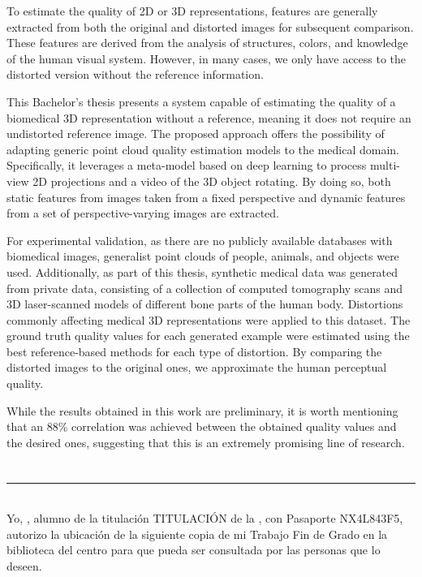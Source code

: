 To estimate the quality of 2D or 3D representations, features are generally extracted 
from both the original and distorted images for subsequent comparison. 
These features are derived from the analysis of structures, colors, and knowledge 
of the human visual system. However, in many cases, we only have access to the 
distorted version without the reference information.
\smallskip

This Bachelor's thesis presents a system capable of estimating the quality of a 
biomedical 3D representation without a reference, meaning it does not require an 
undistorted reference image. The proposed approach offers the possibility of adapting 
generic point cloud quality estimation models to the medical domain. Specifically, 
it leverages a meta-model based on deep learning to process multi-view 2D projections 
and a video of the 3D object rotating. By doing so, both static features from images 
taken from a fixed perspective and dynamic features from a set of perspective-varying images are extracted.
\smallskip

For experimental validation, as there are no publicly available databases with biomedical images, 
generalist point clouds of people, animals, and objects were used. 
Additionally, as part of this thesis, synthetic medical data was generated from private data, 
consisting of a collection of computed tomography scans and 3D laser-scanned models of 
different bone parts of the human body. Distortions commonly affecting medical 3D 
representations were applied to this dataset. The ground truth quality values for 
each generated example were estimated using the best reference-based methods for 
each type of distortion. By comparing the distorted images to the original ones, 
we approximate the human perceptual quality.
\smallskip

While the results obtained in this work are preliminary, it is worth mentioning 
that an 88\% correlation was achieved between the obtained quality values and the 
desired ones, suggesting that this is an extremely promising line of research.

\chapter*{}
\thispagestyle{empty}

\noindent\rule[-1ex]{\textwidth}{2pt}\\[4.5ex]

Yo, \textbf{\myName}, alumno de la titulación TITULACIÓN de la \textbf{\myFaculty}, 
con Pasaporte NX4L843F5, autorizo la ubicación de la siguiente copia de mi 
Trabajo Fin de Grado en la biblioteca del centro para que pueda ser
consultada por las personas que lo deseen.

